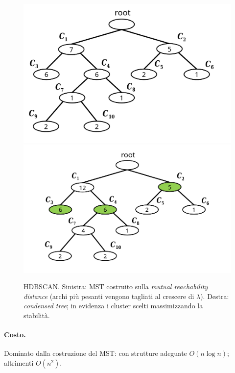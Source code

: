 \begin{figure}[htbp]
  \centering
  \includegraphics[width=.46\textwidth]{images/hdbscan_mst.png}\hfill
  \includegraphics[width=.46\textwidth]{images/hdbscan_condensed_tree.png}
  \caption{HDBSCAN. Sinistra: MST costruito sulla \emph{mutual reachability distance} (archi più pesanti vengono tagliati al crescere di \(\lambda\)). Destra: \emph{condensed tree}; in evidenza i cluster scelti massimizzando la stabilità.}
  \label{fig:hdbscan-figs}
\end{figure}

\paragraph{Costo.} Dominato dalla costruzione del MST: con strutture adeguate $O(n\log n)$; altrimenti $O(n^2)$.